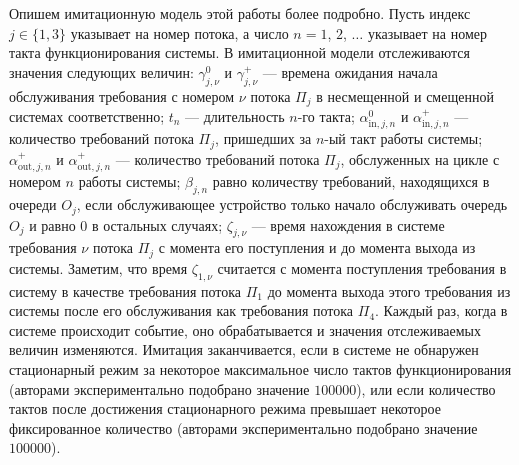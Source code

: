 \documentclass[11pt]{ubs}
\begin{document}
Опишем имитационную модель этой работы более подробно.
Пусть индекс $j\in \{1, 3\}$  указывает на номер потока, а число $n=1$, $2$, $\ldots$ указывает на номер такта функционирования системы.
 В имитационной модели отслеживаются значения следующих величин: $\gamma_{j,\nu}^0$ и $\gamma_{j,\nu}^+$ --- времена ожидания начала обслуживания требования с номером $\nu$ потока $\Pi_j$ в несмещенной и смещенной системах соответственно; $t_n$ --- длительность $n$-го такта;
 $\alpha^{0}_{\text{in}, j,n}$ и $\alpha^{+}_{\text{in},j,n}$  --- количество требований потока $\Pi_j$, пришедших за $n$-ый такт работы системы; 
 $\alpha^{+}_{\text{out},j,n}$ и $\alpha^{+}_{\text{out},j,n}$ --- количество требований потока $\Pi_j$, обслуженных на цикле с номером $n$ работы системы;  $\beta_{j,n}$ равно количеству требований, находящихся в очереди $O_j$, если обслуживающее устройство только начало обслуживать очередь $O_j$ и равно $0$ в остальных случаях; $\zeta_{j,\nu}$ --- время нахождения в системе требования $\nu$ потока $\Pi_j$ с момента его поступления и до момента выхода из системы. Заметим, что время $\zeta_{1,\nu}$ считается с момента поступления требования в систему в качестве требования потока $\Pi_1$ до момента выхода этого требования из системы после его обслуживания как требования потока $\Pi_4$.
 Каждый раз, когда в системе происходит событие, оно обрабатывается и значения отслеживаемых величин изменяются. Имитация заканчивается, 
 если в системе не обнаружен стационарный режим за некоторое максимальное число тактов функционирования (авторами экспериментально подобрано значение $100000$), или если количество тактов после достижения стационарного режима превышает некоторое фиксированное количество (авторами экспериментально подобрано значение $100000$).
 
\end{document}
